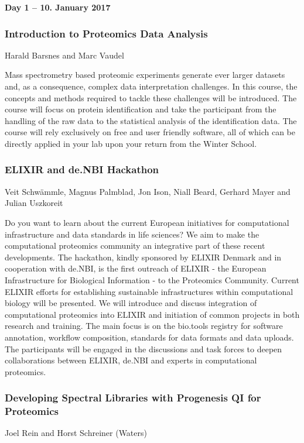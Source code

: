 
\noindent\textbf{Day 1 -- 10. January 2017}

\subsubsection*{\color{eubicRed} Introduction to Proteomics Data Analysis}
{\color{eubicGray}Harald Barsnes and Marc Vaudel}

\noindent
Mass spectrometry based proteomic experiments generate ever larger datasets and,
as a consequence, complex data interpretation challenges. In this course, the
concepts and methods required to tackle these challenges will be introduced. The
course will focus on protein identification and take the participant from the
handling of the raw data to the statistical analysis of the identification data.
The course will rely exclusively on free and user friendly software, all of
which can be directly applied in your lab upon your return from the Winter
School.


\subsubsection*{\color{eubicRed} ELIXIR and de.NBI Hackathon}
{\color{eubicGray} Veit Schw\"ammle, Magnus Palmblad, Jon Ison, Niall Beard, Gerhard Mayer and Julian Uszkoreit }

Do you want to learn about the current European initiatives for computational
infrastructure and data standards in life sciences? We aim to make the
computational proteomics community an integrative part of these recent
developments. The hackathon, kindly sponsored by ELIXIR Denmark and in
cooperation with de.NBI, is the first outreach of ELIXIR - the European
Infrastructure for Biological Information - to the Proteomics Community. Current
ELIXIR efforts for establishing sustainable infrastructures within computational
biology will be presented. We will introduce and discuss integration of
computational proteomics into ELIXIR and initiation of common projects in both
research and training. The main focus is on the bio.tools registry for software
annotation, workflow composition, standards for data formats and data uploads.
The participants will be engaged in the discussions and task forces to deepen
collaborations between ELIXIR, de.NBI and experts in computational proteomics.


\subsubsection*{\color{eubicRed} Developing Spectral Libraries with Progenesis QI for Proteomics}
{\color{eubicGray} Joel Rein and Horst Schreiner (Waters)}


